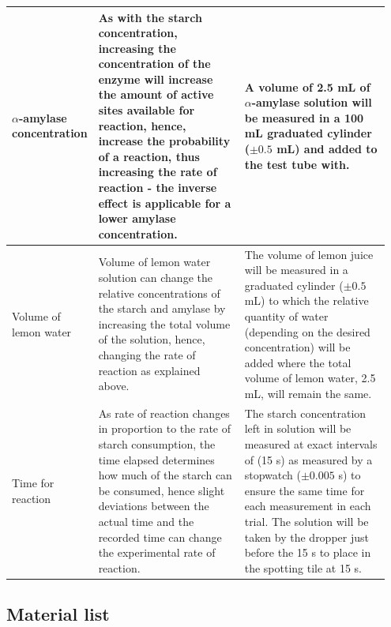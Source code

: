 \documentclass[12pt]{article}
\begin{document}
\begin{table}[H]
\centering
\begin{tabular}{|p{0.15\linewidth}|p{0.4\linewidth}|p{0.4\linewidth}|}
\hline
    $\alpha$-amylase concentration 
    & As with the starch concentration, increasing the concentration of the enzyme will increase the amount of active sites available for reaction, hence, increase the probability of a reaction, thus increasing the rate of reaction - the inverse effect is applicable for a lower amylase concentration.
    & A volume of 2.5 mL of $\alpha$-amylase solution will be measured in a 100 mL graduated cylinder ($\pm 0.5$ mL) and added to the test tube with. \\ 
\hline
    Volume of lemon water  
    & Volume of lemon water solution can change the relative concentrations of the starch and amylase by increasing the total volume of the solution, hence, changing the rate of reaction as explained above.
    & The volume of lemon juice will be measured in a graduated cylinder ($\pm 0.5$ mL) to which the relative quantity of water (depending on the desired concentration) will be added where the total volume of lemon water, 2.5 mL, will remain the same.  \\ 
\hline
    Time for reaction 
    & As rate of reaction changes in proportion to the rate of starch consumption, the time elapsed determines how much of the starch can be consumed, hence slight deviations between the actual time and the recorded time can change the experimental rate of reaction.
    & The starch concentration left in solution will be measured at exact intervals of (15 s) as measured by a stopwatch ($\pm 0.005$ s) to ensure the same time for each measurement in each trial. The solution will be taken by the dropper just before the 15 s to place in the spotting tile at 15 s. \\ 
\hline
\end{tabular}
\end{table}

\subsection{Material list}
\end{document}
